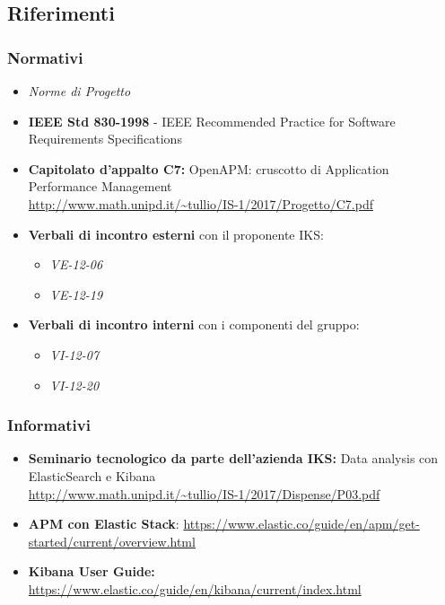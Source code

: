 	\subsection{Riferimenti}
	\subsubsection{Normativi}
	\begin{itemize}
		\item \emph{Norme di Progetto}
		\item \textbf{IEEE Std 830-1998} - IEEE Recommended Practice for Software Requirements Specifications
		\item \textbf{Capitolato d'appalto C7:} OpenAPM: cruscotto di Application Performance Management \\ \url{http://www.math.unipd.it/~tullio/IS-1/2017/Progetto/C7.pdf}
		\item \textbf{Verbali di incontro esterni } con il proponente IKS: \begin{itemize}
			\item \emph{VE-12-06}
			\item \emph{VE-12-19}
		\end{itemize}
		\item \textbf{Verbali di incontro interni }con i componenti del gruppo:
		\begin{itemize}
			\item \emph{VI-12-07}
			\item \emph{VI-12-20}
		\end{itemize}
	\end{itemize}
	
	\subsubsection{Informativi}
	\begin{itemize}
		\item \textbf{Seminario tecnologico da parte dell'azienda IKS:} Data analysis con ElasticSearch e Kibana \\ \url{http://www.math.unipd.it/~tullio/IS-1/2017/Dispense/P03.pdf}
		\item \textbf{APM con Elastic Stack}: \url{https://www.elastic.co/guide/en/apm/get-started/current/overview.html}
		\item \textbf{Kibana User Guide:} \url{https://www.elastic.co/guide/en/kibana/current/index.html}
	
	\end{itemize}
	